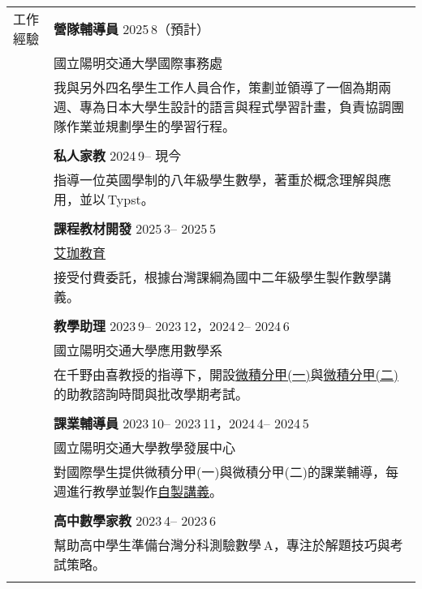 \documentclass[letterpaper, 11pt]{article}
\newcommand{\ms}{\,}
\begin{document}
\begin{CJK*}{UTF8}{bkai}
\begin{center}
\begin{longtable}{p{0.72in}p{5.97in}}
        
        {\textcolor{OliveGreen}{工作經驗}} & \textbf{營隊輔導員} \hfill 2025\ms8（預計） \\
        & 國立陽明交通大學國際事務處 \\
        & 我與另外四名學生工作人員合作，策劃並領導了一個為期兩週、專為日本大學生設計的語言與程式學習計畫，負責協調團隊作業並規劃學生的學習行程。\\
        & \\

        & \textbf{私人家教} \hfill 2024\ms9 -- 現今 \\
        & 指導一位英國學制的八年級學生數學，著重於概念理解與應用，並以\ms Typst。\\
        & \\
        
        & \textbf{課程教材開發} \hfill 2025\ms3 -- 2025\ms5 \\
        & \href{https://www.instagram.com/aijiatutoring/}{艾珈教育}\\
        & 接受付費委託，根據台灣課綱為國中二年級學生製作數學講義。\\
        & \\

        & \textbf{教學助理}  \hfill 2023\ms9 -- 2023\ms12，2024\ms2 -- 2024\ms6 \\
        & 國立陽明交通大學應用數學系\\
        & 在千野由喜教授的指導下，開設\href{https://reurl.cc/Djp5jN}{微積分甲(一)}與\href{https://reurl.cc/RqoMez}{微積分甲(二)}的助教諮詢時間與批改學期考試。\\
        & \\

        & \textbf{課業輔導員} \hfill 2023\ms10 -- 2023\ms11，2024\ms4 -- 2024\ms5 \\
        & 國立陽明交通大學教學發展中心\\
        & 對國際學生提供微積分甲(一)與微積分甲(二)的課業輔導，每週進行教學並製作\href{https://github.com/eiken59/2024_II_Tutor}{自製講義}。\\
        & \\

        & \textbf{高中數學家教} \hfill 2023\ms4 -- 2023\ms6 \\
        & 幫助高中學生準備台灣分科測驗數學\ms A，專注於解題技巧與考試策略。\\
        & \\


\end{longtable}
\end{center}
\end{CJK*}
\end{document}
